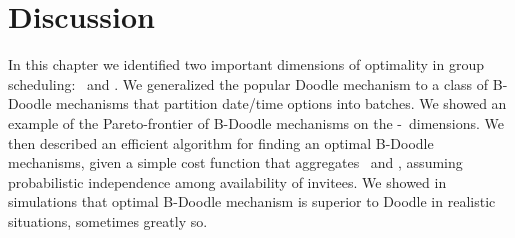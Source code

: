 \section{Discussion}

In this chapter we identified two important dimensions of optimality in
group scheduling: \Time\ and \Inconvenience. We generalized the popular
Doodle mechanism to a class of B-Doodle mechanisms that partition date/time
options into batches. We showed an example of the Pareto-frontier of
B-Doodle mechanisms on the \Time-\Inconvenience\ dimensions. We then
described an efficient algorithm for finding an optimal B-Doodle
mechanisms, given a simple cost function that aggregates \Time\ and
\Inconvenience, assuming probabilistic independence among availability
of invitees. We showed in simulations that optimal B-Doodle mechanism
is superior to Doodle in realistic situations, sometimes greatly so.


%
